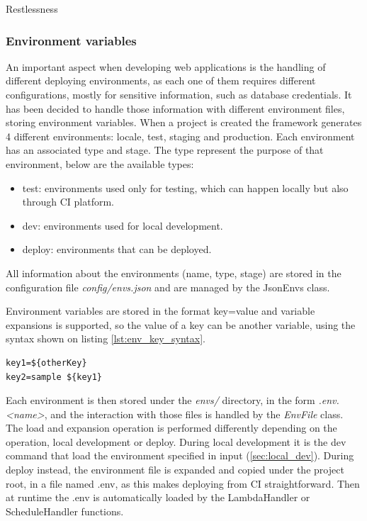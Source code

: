 \begin{chapter}{Restlessness}
    \subsubsection{Environment variables}
    \label{sec:env_vars}
    An important aspect when developing web applications is the handling of different
    deploying environments, as each one of them requires different configurations,
    mostly for sensitive information, such as database credentials.
    It has been decided to handle those information with different environment files,
    storing environment variables.
    When a project is created the framework generates 4 different environments: locale,
    test, staging and production. Each environment has an associated type and stage.
    The type represent the purpose of that environment, below are the available types:
    \begin{itemize}
        \item test: environments used only for testing, which can happen locally
            but also through CI platform.
        \item dev: environments used for local development.
        \item deploy: environments that can be deployed.
    \end{itemize}
    All information about the environments (name, type, stage) are stored in the
    configuration file \textit{config/envs.json} and are managed by the JsonEnvs
    class.

    Environment variables are stored in the format key=value and variable expansions
    is supported, so the value of a key can be another variable, using the syntax
    shown on listing \ref{lst:env_key_syntax}.

    \begin{lstlisting}[caption=Environment variable syntax, label={lst:env_key_syntax}]
key1=${otherKey}
key2=sample ${key1}
    \end{lstlisting}

    \noindent
    Each environment is then stored under the \mbox{\textit{envs/}} directory, in
    the form \mbox{\textit{.env.<name>}}, and the interaction with those files is
    handled by the \textit{EnvFile} class. The load and expansion operation is
    performed differently depending on the operation, local development or deploy.
    During local development it is the dev command that load the environment specified
    in input (\ref{sec:local_dev}). During deploy instead, the environment file
    is expanded and copied under the project root, in a file named .env, as this
    makes deploying from CI straightforward. Then at runtime the .env is automatically
    loaded by the LambdaHandler or ScheduleHandler functions.


\end{chapter}
